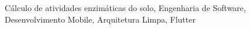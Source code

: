 \lipsum[1]

\begin{keywords}
Cálculo de atividades enzimáticas do solo, Engenharia de Software, Desenvolvimento Mobile, Arquitetura Limpa, Flutter
\end{keywords}